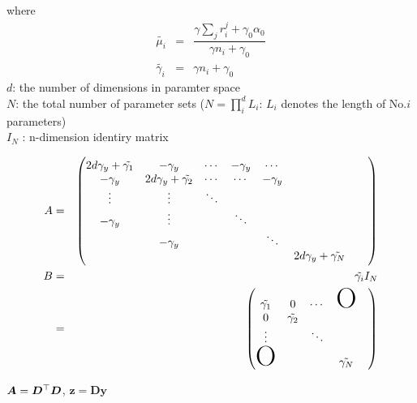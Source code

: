 \documentclass[platex, a4paper]{jsarticle}
\begin{document}
where
\begin{eqnarray}
  \tilde{\mu_i} &=& \dfrac {\gamma \sum _{j}r_{i}^{j}+\gamma_0\alpha _{0}} {\gamma n_{i}+\gamma _{0}} \\
  \tilde{\gamma_i} &=& \gamma n_{i}+\gamma _{0}
\end{eqnarray}
$d$: the number of dimensions in paramter space \\
$N$: the total number of parameter sets ($N=\prod_i^d L_i$: $L_i$ denotes the length of No.$i$ parameters) \\
$I_{N}$ : n-dimension identiry matrix


\begin{eqnarray}
  A &=& \begin{pmatrix}
  2d\gamma_y + \tilde{\gamma_1} & -\gamma_y   & \cdots & -\gamma_y   & \cdots &\\
  -\gamma_y & 2d\gamma_y + \tilde{\gamma_2} &\cdots &  \cdots &  -\gamma_y  &  \\
  \vdots&\vdots& \ddots &&& \\
  -\gamma_y &\vdots&& \ddots &&& \\
  &-\gamma_y&&& \ddots &&& \\
  &&&&& 2d\gamma_y + \tilde{\gamma_N} \\
  \end{pmatrix} \\
  B &=& \tilde {\gamma_i} I_{N} \\
    &=& \begin{pmatrix}
      \tilde{\gamma_1} & 0 & \cdots & \mbox{\Huge O}\\
      0 & \tilde{\gamma_2} & && \\
      \vdots & & \ddots \\
      \mbox{\Huge O}&&& \tilde{\gamma_N}
  \end{pmatrix}
\end{eqnarray}

$\bm{A}=\bm{D}^{\top} \bm{D}$, $\bm{z}=\bm{D}\bm{y}$
\end{document}
